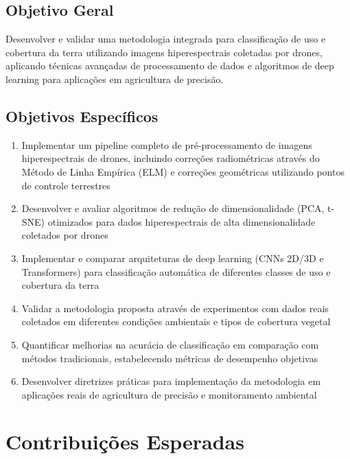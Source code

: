 \subsection{Objetivo Geral}
Desenvolver e validar uma metodologia integrada para classificação de uso e cobertura da terra utilizando imagens hiperespectrais coletadas por drones, aplicando técnicas avançadas de processamento de dados e algoritmos de deep learning para aplicações em agricultura de precisão.

\subsection{Objetivos Específicos}
\begin{enumerate}
    \item Implementar um pipeline completo de pré-processamento de imagens hiperespectrais de drones, incluindo correções radiométricas através do Método de Linha Empírica (ELM) e correções geométricas utilizando pontos de controle terrestres
    
    \item Desenvolver e avaliar algoritmos de redução de dimensionalidade (PCA, t-SNE) otimizados para dados hiperespectrais de alta dimensionalidade coletados por drones
    
    \item Implementar e comparar arquiteturas de deep learning (CNNs 2D/3D e Transformers) para classificação automática de diferentes classes de uso e cobertura da terra
    
    \item Validar a metodologia proposta através de experimentos com dados reais coletados em diferentes condições ambientais e tipos de cobertura vegetal
    
    \item Quantificar melhorias na acurácia de classificação em comparação com métodos tradicionais, estabelecendo métricas de desempenho objetivas
    
    \item Desenvolver diretrizes práticas para implementação da metodologia em aplicações reais de agricultura de precisão e monitoramento ambiental
\end{enumerate}

\section{Contribuições Esperadas}\label{sec:contribuicoes}

